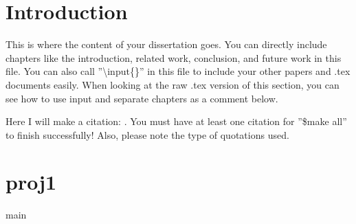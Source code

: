 \newcommand{\tableScale}{0.70}

\newcommand{\singlePic}{0.33}

\newcommand{\singlePicBig}{0.66}

\chapter{Introduction}
This is where the content of your dissertation goes.  You can directly include chapters like the introduction, related work, conclusion, and future work in this file.  You can also call ''\textbackslash input\{\}'' in this file to include your other papers and .tex documents easily.  When looking at the raw .tex version of this section, you can see how to use input and separate chapters as a comment below.

Here I will make a citation: \cite{mobile_marketshare}.  You must have at least one citation for ''\$make all'' to finish successfully!  Also, please note the type of quotations used.

%


\chapter{proj1}
\label{cht:proj1}
{main}
\setcounter{equation}{0}
\cleardoublepage